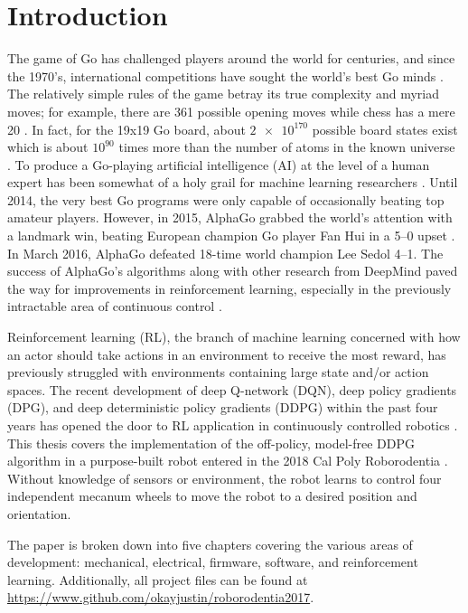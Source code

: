 \chapter{Introduction}
The game of Go has challenged players around the world for centuries, and since the 1970's, international competitions have sought the world's best Go minds \cite{go}. The relatively simple rules of the game betray its true complexity and myriad moves; for example, there are 361 possible opening moves while chess has a mere 20 \cite{brit_go}. In fact, for the 19x19 Go board, about $\num{2e170}$ possible board states exist which is about $10^{90}$ times more than the number of atoms in the known universe \cite{go_num}. To produce a Go-playing artificial intelligence (AI) at the level of a human expert has been somewhat of a holy grail for machine learning researchers \cite{brit_go2}. Until 2014, the very best Go programs were only capable of occasionally beating top amateur players. However, in 2015, AlphaGo grabbed the world's attention with a landmark win, beating European champion Go player Fan Hui in a 5--0 upset \cite{brit_go3}. In March 2016, AlphaGo defeated 18-time world champion Lee Sedol 4--1. The success of AlphaGo's algorithms along with other research from DeepMind paved the way for improvements in reinforcement learning, especially in the previously intractable area of continuous control \cite{Mnih_2015}\cite{silver_2017}.

 Reinforcement learning (RL), the branch of machine learning concerned with how an actor should take actions in an environment to receive the most reward, has previously struggled with environments containing large state and/or action spaces. The recent  development of deep Q-network (DQN), deep policy gradients (DPG), and deep deterministic policy gradients (DDPG) within the past four years has opened the door to RL application in continuously controlled robotics  \cite{Mnih_2015}\cite{silver_lever_heess_degris_wierstra_riedmiller}\cite{lillicrap_2016}. This thesis covers the implementation of the off-policy, model-free DDPG algorithm in a purpose-built robot entered in the 2018 Cal Poly Roborodentia \cite{roborodentia}. Without knowledge of sensors or environment, the robot learns to control four independent mecanum wheels to move the robot to a desired position and orientation. 
 
 The paper is broken down into five chapters covering the various areas of development: mechanical, electrical, firmware, software, and reinforcement learning. Additionally, all project files can be found at \url{https://www.github.com/okayjustin/roborodentia2017}.


